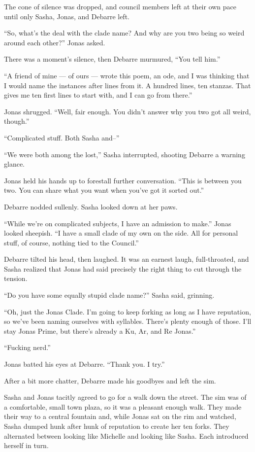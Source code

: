 The cone of silence was dropped, and council members left at their own pace until only Sasha, Jonas, and Debarre left.

``So, what's the deal with the clade name? And why are you two being so weird around each other?'' Jonas asked.

There was a moment's silence, then Debarre murmured, ``You tell him.''

``A friend of mine — of ours — wrote this poem, an ode, and I was thinking that I would name the instances after lines from it. A hundred lines, ten stanzas. That gives me ten first lines to start with, and I can go from there.''

Jonas shrugged. ``Well, fair enough. You didn't answer why you two got all weird, though.''

``Complicated stuff. Both Sasha and--''

``We were both among the lost,'' Sasha interrupted, shooting Debarre a warning glance.

Jonas held his hands up to forestall further conversation. ``This is between you two. You can share what you want when you've got it sorted out.''

Debarre nodded sullenly. Sasha looked down at her paws.

``While we're on complicated subjects, I have an admission to make.'' Jonas looked sheepish. ``I have a small clade of my own on the side. All for personal stuff, of course, nothing tied to the Council.''

Debarre tilted his head, then laughed. It was an earnest laugh, full-throated, and Sasha realized that Jonas had said precisely the right thing to cut through the tension.

``Do you have some equally stupid clade name?'' Sasha said, grinning.

``Oh, just the Jonas Clade. I'm going to keep forking as long as I have reputation, so we've been naming ourselves with syllables. There's plenty enough of those. I'll stay Jonas Prime, but there's already a Ku, Ar, and Re Jonas.''

``Fucking nerd.''

Jonas batted his eyes at Debarre. ``Thank you. I try.''

After a bit more chatter, Debarre made his goodbyes and left the sim.

Sasha and Jonas tacitly agreed to go for a walk down the street. The sim was of a comfortable, small town plaza, so it was a pleasant enough walk. They made their way to a central fountain and, while Jonas sat on the rim and watched, Sasha dumped hunk after hunk of reputation to create her ten forks. They alternated between looking like Michelle and looking like Sasha. Each introduced herself in turn.

